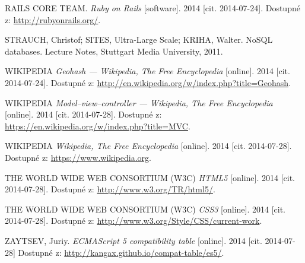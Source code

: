 \begin{thebibliography}{99}
  RAILS CORE TEAM. \textit{Ruby on Rails} [software]. 2014 [cit. 2014-07-24].
  Dostupné z: \url{http://rubyonrails.org/}.

  STRAUCH, Christof; SITES, Ultra-Large Scale; KRIHA, Walter. NoSQL databases. Lecture Notes, Stuttgart Media University, 2011.

  WIKIPEDIA
  \emph{Geohash --- Wikipedia{,} The Free Encyclopedia} [online]. 2014 [cit. 2014-07-24].
  Dostupné z: \url{http://en.wikipedia.org/w/index.php?title=Geohash}.

  WIKIPEDIA
  \emph{Model–view–controller --- Wikipedia{,} The Free Encyclopedia} [online]. 2014 [cit. 2014-07-28].
  Dostupné z: \url{https://en.wikipedia.org/w/index.php?title=MVC}.

  WIKIPEDIA
  \emph{Wikipedia{,} The Free Encyclopedia} [online]. 2014 [cit. 2014-07-28].
  Dostupné z: \url{https://www.wikipedia.org}.

  THE WORLD WIDE WEB CONSORTIUM (W3C)
  \emph{HTML5} [online]. 2014 [cit. 2014-07-28].
  Dostupné z: \url{http://www.w3.org/TR/html5/}.

  THE WORLD WIDE WEB CONSORTIUM (W3C)
  \emph{CSS3} [online]. 2014 [cit. 2014-07-28].
  Dostupné z: \url{http://www.w3.org/Style/CSS/current-work}.

  ZAYTSEV, Juriy. \textit{ECMAScript 5 compatibility table} [online]. 2014 [cit. 2014-07-28]
  Dostupné z: \url{http://kangax.github.io/compat-table/es5/}.


\end{thebibliography}



